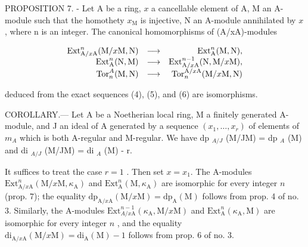PROPOSITION 7. - Let A be a ring, \(x\) a cancellable element of A, M an A-module such that the homothety \(x_{\mathrm{M}}\) is injective, N an A-module annihilated by \(x\), where n is an integer. The canonical homomorphisms of (A/xA)-modules

\[
\begin{array}{r l r} \mathrm{Ext} _ {\mathrm{A} / x \mathrm{A}} ^ {n} (\mathrm{M} / x \mathrm{M}, \mathrm{N}) & \longrightarrow & \mathrm{Ext} _ {\mathrm{A}} ^ {n} (\mathrm{M}, \mathrm{N}), \\ \mathrm{Ext} _ {\mathrm{A}} ^ {n} (\mathrm{N}, \mathrm{M}) & \longrightarrow & \mathrm{Ext} _ {\mathrm{A} / x \mathrm{A}} ^ {n - 1} (\mathrm{N}, \mathrm{M} / x \mathrm{M}), \\ \mathrm{Tor} _ {n} ^ {A} (\mathrm{M}, \mathrm{N}) & \longrightarrow & \mathrm{Tor} _ {n} ^ {\mathrm{A} / x \mathrm{A}} (\mathrm{M} / x \mathrm{M}, \mathrm{N}) \end{array}
\]

deduced from the exact sequences (4), (5), and (6) are isomorphisms.

COROLLARY.--- Let A be a Noetherian local ring, M a finitely generated A-module, and J an ideal of A generated by a sequence \((x_{1},\ldots,x_{r})\) of elements of \(m_{A}\) which is both A-regular and M-regular. We have dp \(_{A/J}\) (M/JM) = dp \(_{A}\) (M) and di \(_{A/J}\) (M/JM) = di \(_{A}\) (M) - r.

It suffices to treat the case \(r = 1\) . Then set \(x = x_1\). The A-modules \(\mathrm{Ext}_{\mathrm{A} / x\mathrm{A}}^{n}(\mathrm{M} / x\mathrm{M},\kappa_{\mathrm{A}})\) and \(\mathrm{Ext}_{\mathrm{A}}^{n}(\mathrm{M},\kappa_{\mathrm{A}})\) are isomorphic for every integer \(n\) (prop. 7); the equality \(\mathrm{dp}_{\mathrm{A} / x\mathrm{A}}(\mathrm{M} / x\mathrm{M}) = \mathrm{dp}_{\mathrm{A}}(\mathrm{M})\) follows from prop. 4 of no. 3. Similarly, the A-modules \(\mathrm{Ext}_{A /x\mathrm{A}}^{n - 1}(\kappa_{\mathrm{A}},\mathrm{M} / x\mathrm{M})\) and \(\mathrm{Ext}_{\mathrm{A}}^{n}(\kappa_{\mathrm{A}},\mathrm{M})\) are isomorphic for every integer \(n\) , and the equality \(\mathrm{di}_{\mathrm{A} / x\mathrm{A}}(\mathrm{M} / x\mathrm{M}) = \mathrm{di}_{\mathrm{A}}(\mathrm{M}) - 1\) follows from prop. 6 of no. 3.

